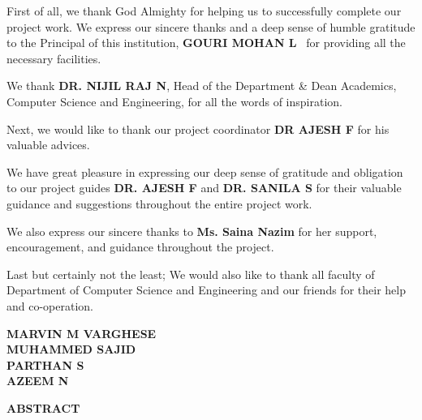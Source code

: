 \documentclass[12pt,a4paper,oneside]{report}
\begin{document}
\setlength{\parindent}{0pt}
\setlength{\parskip}{0.8em}

First of all, we thank God Almighty for helping us to successfully complete our project work. We express our sincere thanks and a deep sense of humble gratitude to the Principal of this institution, \textbf{GOURI MOHAN L} ~for providing all the necessary facilities.

We thank \textbf{DR. NIJIL RAJ N}, Head of the Department \& Dean Academics, Computer Science and Engineering, for all the words of inspiration.

Next, we would like to thank our project coordinator \textbf{DR AJESH F} for his valuable advices.

We have great pleasure in expressing our deep sense of gratitude and obligation to our project guides \textbf{DR. AJESH F} and \textbf{DR. SANILA S} for their valuable guidance and suggestions throughout the entire project work.

We also express our sincere thanks to \textbf{Ms. Saina Nazim} for her support, encouragement, and guidance throughout the project.

Last but certainly not the least; We would also like to thank all faculty of Department of Computer Science and Engineering and our friends for their help and co-operation.

\vspace{6em}

\begin{flushright}
\textbf{MARVIN M VARGHESE}\\
\textbf{MUHAMMED SAJID}\\
\textbf{PARTHAN S}\\
\textbf{AZEEM N}
\end{flushright}

\vfill
\begin{center}
  
\end{center}

\newpage
\setlength{\parskip}{6pt}


\cleardoublepage
{}
{}
\label{front:abstract}
\thispagestyle{plain}

\begin{center}
{\fontsize{12}{14}\bfseries ABSTRACT\par}
\end{center}
\end{document}
